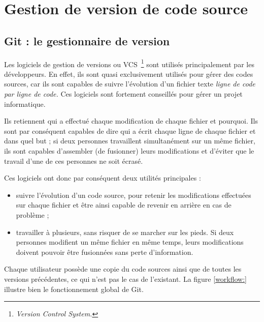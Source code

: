 \chapter{Gestion de version de code source}

\section{Git : le gestionnaire de version}

Les logiciels de gestion de versions ou VCS\, \footnote{\emph{Version Control
System.}} sont utilisés principalement par les développeurs. En effet, ils sont
quasi exclusivement utilisés pour gérer des codes sources, car ils sont
capables de suivre l’évolution d’un fichier texte \emph{ligne de code par ligne de
code.} Ces logiciels sont fortement conseillés pour gérer un projet
informatique.

Ils retiennent qui a effectué chaque modification de chaque fichier et
pourquoi. Ils sont par conséquent capables de dire qui a écrit chaque ligne de
chaque fichier et dans quel but ; si deux personnes travaillent simultanément
sur un même fichier, ils sont capables d’assembler (de fusionner) leurs
modifications et d’éviter que le travail d’une de ces personnes ne soit écrasé.

Ces logiciels ont donc par conséquent deux utilités principales :
\begin{itemize}
    \item suivre l’évolution d’un code source, pour retenir les modifications
effectuées sur chaque fichier et être ainsi capable de revenir en arrière en
cas de problème ;
    \item travailler à plusieurs, sans risquer de se marcher sur les pieds.
Si deux personnes modifient un même fichier en même temps, leurs modifications
doivent pouvoir être fusionnées sans perte d’information.
\end{itemize}

Chaque utilisateur possède une copie du code sources ainsi que de toutes les
versions précédentes, ce qui n'est pas le cas de l'existant. La figure
\ref{workflow:} illustre bien le fonctionnement global de Git.

